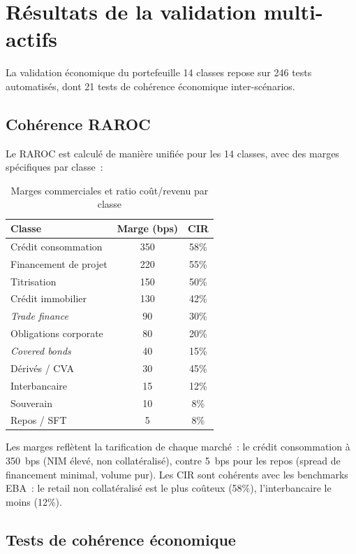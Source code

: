 \documentclass[12pt, a4paper, twoside, openright]{report}
\theoremstyle{definition}
\begin{document}
\section{Résultats de la validation multi-actifs}
\label{sec:multi-resultats}

La validation économique du portefeuille 14 classes repose sur 246 tests automatisés, dont 21 tests de cohérence économique inter-scénarios.

\subsection{Cohérence RAROC}

Le RAROC est calculé de manière unifiée pour les 14 classes, avec des marges spécifiques par classe~:

\begin{table}[htbp]
\centering
\caption{Marges commerciales et ratio coût/revenu par classe}
\label{tab:margins-14}
\begin{tabular}{lcc}
\toprule
\textbf{Classe} & \textbf{Marge (bps)} & \textbf{CIR} \\
\midrule
Crédit consommation & 350 & 58\% \\
Financement de projet & 220 & 55\% \\
Titrisation & 150 & 50\% \\
Crédit immobilier & 130 & 42\% \\
\textit{Trade finance} & 90 & 30\% \\
Obligations corporate & 80 & 20\% \\
\textit{Covered bonds} & 40 & 15\% \\
Dérivés / CVA & 30 & 45\% \\
Interbancaire & 15 & 12\% \\
Souverain & 10 & 8\% \\
Repos / SFT & 5 & 8\% \\
\bottomrule
\end{tabular}
\end{table}

Les marges reflètent la tarification de chaque marché~: le crédit consommation à 350~bps (NIM élevé, non collatéralisé), contre 5~bps pour les repos (spread de financement minimal, volume pur). Les CIR sont cohérents avec les benchmarks EBA~: le retail non collatéralisé est le plus coûteux (58\%), l'interbancaire le moins (12\%).

\subsection{Tests de cohérence économique}
\end{document}
